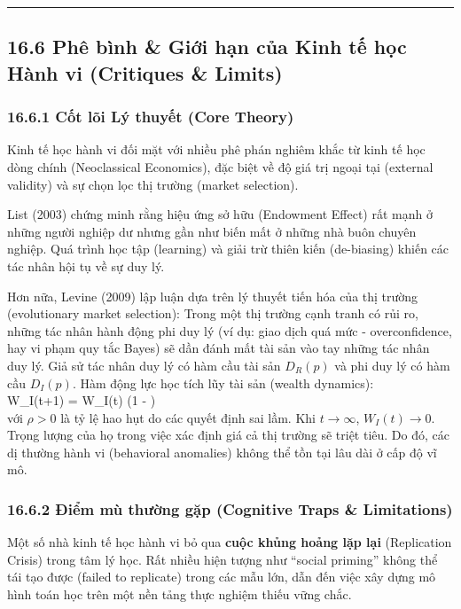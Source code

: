 \documentclass[
]{article}
\begin{document}
\begin{center}\rule{0.5\linewidth}{0.5pt}\end{center}

\subsection{16.6 Phê bình \& Giới hạn của Kinh tế học Hành vi (Critiques
\&
Limits)}\label{phuxea-buxecnh-giux1edbi-hux1ea1n-cux1ee7a-kinh-tux1ebf-hux1ecdc-huxe0nh-vi-critiques-limits}

\subsubsection{16.6.1 Cốt lõi Lý thuyết (Core
Theory)}\label{cux1ed1t-luxf5i-luxfd-thuyux1ebft-core-theory-65}

Kinh tế học hành vi đối mặt với nhiều phê phán nghiêm khắc từ kinh tế
học dòng chính (Neoclassical Economics), đặc biệt về độ giá trị ngoại
tại (external validity) và sự chọn lọc thị trường (market selection).

List (2003) chứng minh rằng hiệu ứng sở hữu (Endowment Effect) rất mạnh
ở những người nghiệp dư nhưng gần như biến mất ở những nhà buôn chuyên
nghiệp. Quá trình học tập (learning) và giải trừ thiên kiến (de-biasing)
khiến các tác nhân hội tụ về sự duy lý.

Hơn nữa, Levine (2009) lập luận dựa trên lý thuyết tiến hóa của thị
trường (evolutionary market selection): Trong một thị trường cạnh tranh
có rủi ro, những tác nhân hành động phi duy lý (ví dụ: giao dịch quá mức
- overconfidence, hay vi phạm quy tắc Bayes) sẽ dần đánh mất tài sản vào
tay những tác nhân duy lý. Giả sử tác nhân duy lý có hàm cầu tài sản
\(D_R(p)\) và phi duy lý có hàm cầu \(D_I(p)\). Hàm động lực học tích
lũy tài sản (wealth dynamics): \[
\] W\_I(t+1) = W\_I(t) \cdot (1 - \rho) \[
\] với \(\rho > 0\) là tỷ lệ hao hụt do các quyết định sai lầm. Khi
\(t \to \infty\), \(W_I(t) \to 0\). Trọng lượng của họ trong việc xác
định giá cả thị trường sẽ triệt tiêu. Do đó, các dị thường hành vi
(behavioral anomalies) không thể tồn tại lâu dài ở cấp độ vĩ mô.

\subsubsection{16.6.2 Điểm mù thường gặp (Cognitive Traps \&
Limitations)}\label{ux111iux1ec3m-muxf9-thux1b0ux1eddng-gux1eb7p-cognitive-traps-limitations-116}

Một số nhà kinh tế học hành vi bỏ qua \textbf{cuộc khủng hoảng lặp lại}
(Replication Crisis) trong tâm lý học. Rất nhiều hiện tượng như ``social
priming'' không thể tái tạo được (failed to replicate) trong các mẫu
lớn, dẫn đến việc xây dựng mô hình toán học trên một nền tảng thực
nghiệm thiếu vững chắc.
\end{document}
